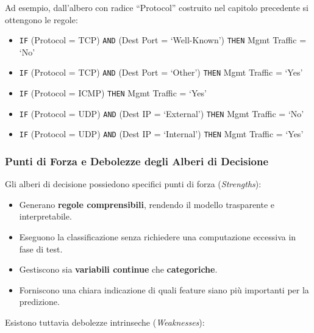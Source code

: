 Ad esempio, dall'albero con radice ``Protocol'' costruito
nel capitolo precedente si ottengono le regole:

\begin{itemize}
    \item \texttt{IF} (Protocol = TCP)
        \texttt{AND} (Dest Port = `Well-Known')
        \texttt{THEN} Mgmt Traffic = `No'
    \item \texttt{IF} (Protocol = TCP)
        \texttt{AND} (Dest Port = `Other')
        \texttt{THEN} Mgmt Traffic = `Yes'
    \item \texttt{IF} (Protocol = ICMP)
        \texttt{THEN} Mgmt Traffic = `Yes'
    \item \texttt{IF} (Protocol = UDP)
        \texttt{AND} (Dest IP = `External')
        \texttt{THEN} Mgmt Traffic = `No'
    \item \texttt{IF} (Protocol = UDP)
        \texttt{AND} (Dest IP = `Internal')
        \texttt{THEN} Mgmt Traffic = `Yes'
\end{itemize}

\subsubsection{Punti di Forza e Debolezze degli Alberi
di Decisione}

Gli alberi di decisione possiedono specifici punti di
forza (\textit{Strengths}):

\begin{itemize}
    \item Generano \textbf{regole comprensibili},
        rendendo il modello trasparente e interpretabile.
    \item Eseguono la classificazione senza richiedere
        una computazione eccessiva in fase di test.
    \item Gestiscono sia \textbf{variabili continue}
        che \textbf{categoriche}.
    \item Forniscono una chiara indicazione di quali
        feature siano più importanti per la predizione.
\end{itemize}

Esistono tuttavia debolezze intrinseche
(\textit{Weaknesses}):

